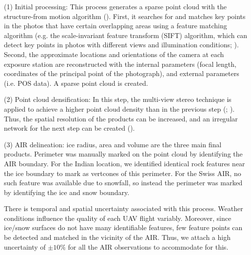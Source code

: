 \documentclass[utf8]{frontiersSCNS}
\begin{document}
(1) Initial processing: This process generates a sparse point cloud with the structure-from motion algorithm
(\cite{Turner_2012}). First, it searches for and matches key points in the photos that have certain overlapping
areas using a feature matching algorithm (e.g. the scale-invariant feature transform (SIFT) algorithm, which can
detect key points in photos with different views and illumination conditions; \cite{Lowe_2004}). Second, the
approximate locations and orientations of the camera at each exposure station are reconstructed with the internal
parameters (focal length, coordinates of the principal point of the photograph), and external parameters (i.e. POS
data). A sparse point cloud is created.

(2) Point cloud densification: In this step, the multi-view stereo technique is applied to achieve a higher point
cloud density than in the previous step (\cite{Furukawa_2010}; \cite{Molg_2017}). Thus, the spatial resolution of
the products can be increased, and an irregular network for the next step can be created (\cite{Kung_2011}).

(3) AIR delineation: ice radius, area and volume are the three main final products. Perimeter was manually marked
on the point cloud by identifying the AIR boundary. For the Indian location, we identified identical rock features
near the ice boundary to mark as vertcones of this perimeter. For the Swiss AIR, no such feature was available due
to snowfall, so instead the perimeter was marked by identifying the ice and snow boundary.

There is temporal and spatial uncertainty associated with this process. Weather conditions influence the quality
of each UAV flight variably. Moreover, since ice/snow surfaces do not have many identifiable features, few
feature points can be detected and matched in the vicinity of the AIR. Thus, we attach a high uncertainty of
$\pm 10 \%$ for all the AIR observations to accommodate for this.
\end{document}
